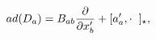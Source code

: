 \begin{equation}
ad(D_{a})=B_{ab}
\frac{\partial}{\partial x_{b}^{\prime}}
+[a_{a}^{\prime},\cdot\hspace{0.2cm}]_{\star}, 
\end{equation}

